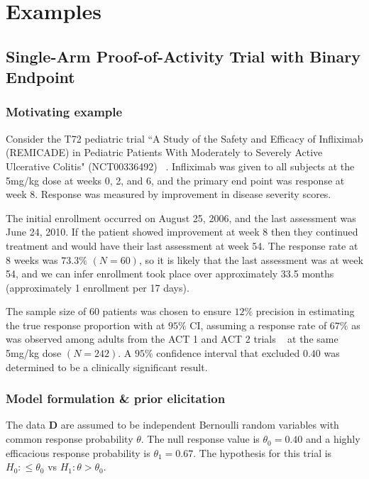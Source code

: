 \documentclass[12pt]{article}
\begin{document}

\section{Examples}\label{sec:examples}

\subsection{Single-Arm Proof-of-Activity Trial with Binary Endpoint}\label{sec:example1}
\subsubsection{Motivating example}
Consider the T72 pediatric trial ``A Study of the Safety and Efficacy of Infliximab (REMICADE) in Pediatric Patients With Moderately to Severely Active Ulcerative Colitis" (NCT00336492) ~\citep{Hyams2012}. Infliximab was given to all subjects at the 5mg/kg dose at weeks 0, 2, and 6, and the primary end point was response at week 8. Response was measured by improvement in disease severity scores.

The initial enrollment occurred on August 25, 2006, and the last assessment was June 24, 2010. If the patient showed improvement at week 8 then they continued treatment and would have their last assessment at week 54. The response rate at 8 weeks was $73.3\%$ $(N=60)$, so it is likely that the last assessment was at week 54, and we can infer enrollment took place over approximately 33.5 months (approximately 1 enrollment per 17 days). 

The sample size of $60$ patients was chosen to ensure $12\%$ precision in estimating the true response proportion with at $95\%$ CI, assuming a response rate of $67\%$ as was observed among adults from the ACT 1 and ACT 2 trials ~\citep{Rutgeerts2005} at the same 5mg/kg dose $(N=242)$. A $95\%$ confidence interval that excluded $0.40$ was determined to be a clinically significant result.

\subsubsection{Model formulation \& prior elicitation}\label{sec:example1model}
The data $\mathbf{D}$ are assumed to be independent Bernoulli random variables with common response probability $\theta$. The null response value is $\theta_0=0.40$ and a highly efficacious response probability is $\theta_1=0.67$. The hypothesis for this trial is $H_0:\leq \theta_0$ vs $H_1:\theta > \theta_0$.
\end{document}
